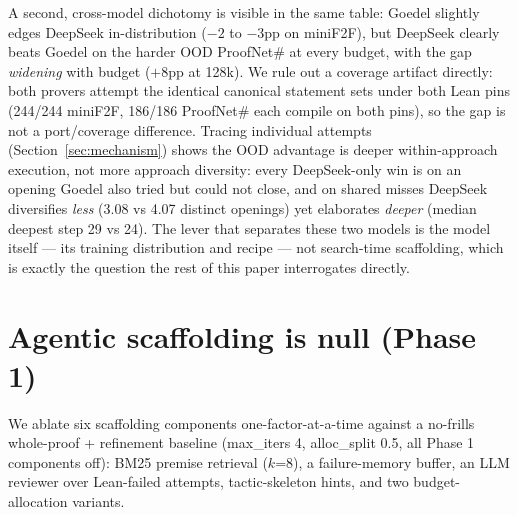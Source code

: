 \documentclass{article}
\begin{document}
A second, cross-model dichotomy is visible in the same table: Goedel slightly edges DeepSeek
in-distribution ($-2$ to $-3$pp on miniF2F), but DeepSeek clearly beats Goedel on the harder OOD
ProofNet\# at every budget, with the gap \emph{widening} with budget ($+8$pp at 128k). We rule out a
coverage artifact directly: both provers attempt the identical canonical statement sets under both Lean
pins (244/244 miniF2F, 186/186 ProofNet\# each compile on both pins), so the gap is not a
port/coverage difference. Tracing individual attempts (Section~\ref{sec:mechanism}) shows the OOD
advantage is deeper within-approach execution, not more approach diversity: every DeepSeek-only win is
on an opening Goedel also tried but could not close, and on shared misses DeepSeek diversifies
\emph{less} (3.08 vs 4.07 distinct openings) yet elaborates \emph{deeper} (median deepest step 29 vs
24). The lever that separates these two models is the model itself --- its training distribution and
recipe --- not search-time scaffolding, which is exactly the question the rest of this paper
interrogates directly.

\section{Agentic scaffolding is null (Phase 1)}
\label{sec:scaffolding}

We ablate six scaffolding components one-factor-at-a-time against a no-frills whole-proof + refinement
baseline (max\_iters 4, alloc\_split 0.5, all Phase 1 components off): BM25 premise retrieval ($k$=8),
a failure-memory buffer, an LLM reviewer over Lean-failed attempts, tactic-skeleton hints, and two
budget-allocation variants.
\end{document}
